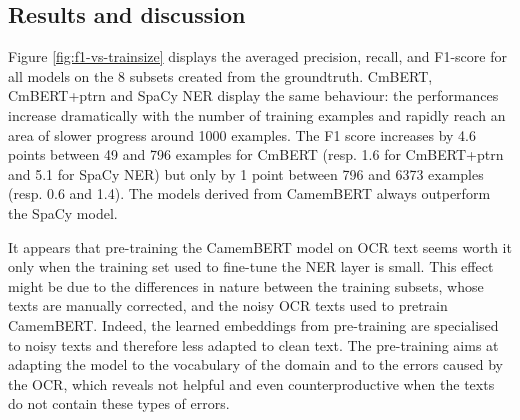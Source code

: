 


\subsection{Results and discussion}
Figure \ref{fig:f1-vs-trainsize} displays the averaged precision, recall, and F1-score for all models on the 8 subsets created from the groundtruth.
CmBERT, CmBERT+ptrn and SpaCy NER display the same behaviour: the performances increase dramatically with the number of training examples and rapidly reach an area of slower progress around 1000 examples.
The F1 score increases by 4.6 points between 49 and 796 examples for CmBERT (resp. 1.6 for CmBERT+ptrn and 5.1 for SpaCy NER) but only by 1 point between 796 and 6373 examples (resp. 0.6 and 1.4).
The models derived from CamemBERT always outperform the SpaCy model.

It appears that pre-training the CamemBERT model on OCR text seems worth it only when the training set used to fine-tune the NER layer is small.
This effect might be due to the differences in nature between the training subsets, whose texts are manually corrected, and the noisy OCR texts used to pretrain CamemBERT.
Indeed, the learned embeddings from pre-training are specialised to noisy texts and therefore less adapted to clean text.
The pre-training aims at adapting the model to the vocabulary of the domain and to the errors caused by the OCR, which reveals not helpful and even counterproductive when the texts do not contain these types of errors.

